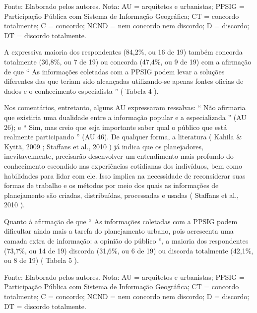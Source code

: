 \documentclass{article}
\begin{document}
Fonte: Elaborado pelos autores. Nota: AU = arquitetos e urbanistas;
								PPSIG = Participação Pública com Sistema de Informação Geográfica;
								CT = concordo totalmente; C = concordo; NCND = nem concordo nem
								discordo; D = discordo; DT = discordo totalmente.

A expressiva maioria dos respondentes (84,2\%, ou 16 de 19) também concorda
					totalmente (36,8\%, ou 7 de 19) ou concorda (47,4\%, ou 9 de 19) com a afirmação
					de que “%
As informações coletadas com a PPSIG podem levar a soluções
						diferentes das que teriam sido alcançadas utilizando-se apenas fontes
						oficias de dados e o conhecimento especialista%
” (%
Tabela 4%
).

Nos comentários, entretanto, alguns AU expressaram ressalvas: “%
Não
						afirmaria que existiria uma dualidade entre a informação popular e a
						especializada%
” (AU 26); e “%
Sim, mas creio que seja
						importante saber qual o público que está realmente participando%
”
					(AU 46). De qualquer forma, a literatura (%
Kahila \& Kyttä, 2009%
; %
Staffans
						et al., 2010%
) já indica que os planejadores, inevitavelmente,
					precisarão desenvolver um entendimento mais profundo do conhecimento escondido
					nas experiências cotidianas dos indivíduos, bem como habilidades para lidar com
					ele. Isso implica na necessidade de reconsiderar suas formas de trabalho e os
					métodos por meio dos quais as informações de planejamento são criadas,
					distribuídas, processadas e usadas (%
Staffans et
						al., 2010%
).

Quanto à afirmação de que “%
As informações coletadas com a PPSIG podem
						dificultar ainda mais a tarefa do planejamento urbano, pois acrescenta uma
						camada extra de informação: a opinião do público%
”, a maioria dos
					respondentes (73,7\%, ou 14 de 19) discorda (31,6\%, ou 6 de 19) ou discorda
					totalmente (42,1\%, ou 8 de 19) (%
Tabela
					5%
).

Fonte: Elaborado pelos autores. Nota: AU = arquitetos e urbanistas;
								PPSIG = Participação Pública com Sistema de Informação Geográfica;
								CT = concordo totalmente; C = concordo; NCND = nem concordo nem
								discordo; D = discordo; DT = discordo totalmente.
\end{document}
